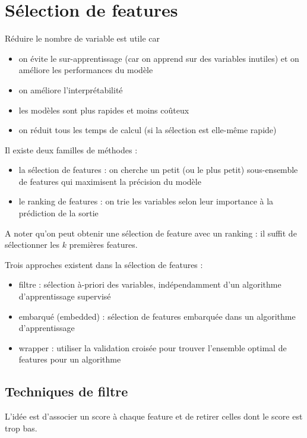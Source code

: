 \chapter{Sélection de features}

Réduire le nombre de variable est utile car

\begin{itemize}
	\item on évite le sur-apprentissage (car on apprend sur des variables inutiles) et on améliore les performances du modèle
	\item on améliore l'interprétabilité
	\item les modèles sont plus rapides et moins coûteux
	\item on réduit tous les temps de calcul (si la sélection est elle-même rapide)
\end{itemize}

Il existe deux familles de méthodes :

\begin{itemize}
	\item la sélection de features : on cherche un petit (ou le plus petit) sous-ensemble de features qui maximisent la précision du modèle
	\item le ranking de features : on trie les variables selon leur importance à la prédiction de la sortie
\end{itemize}

A noter qu'on peut obtenir une sélection de feature avec un ranking : il suffit de sélectionner les $k$ premières features.

Trois approches existent dans la sélection de features :

\begin{itemize}
	\item filtre : sélection à-priori des variables, indépendamment d'un algorithme d'apprentissage supervisé
	\item embarqué (embedded) : sélection de features embarquée dans un algorithme d'apprentissage
	\item wrapper : utiliser la validation croisée pour trouver l'ensemble optimal de features pour un algorithme
\end{itemize}

\section{Techniques de filtre}

	L'idée est d'associer un score à chaque feature et de retirer celles dont le score est trop bas.
	
